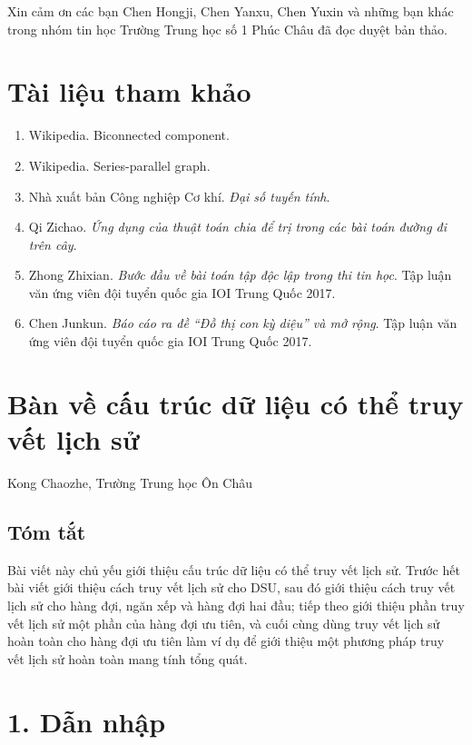 \documentclass[11pt]{article}
\begin{document}
Xin cảm ơn các bạn Chen Hongji, Chen Yanxu, Chen Yuxin và những bạn khác trong
nhóm tin học Trường Trung học số 1 Phúc Châu đã đọc duyệt bản thảo.

\section*{Tài liệu tham khảo}

\begin{enumerate}
  \item Wikipedia. Biconnected component.
  \item Wikipedia. Series-parallel graph.
  \item Nhà xuất bản Công nghiệp Cơ khí. \emph{Đại số tuyến tính}.
  \item Qi Zichao. \emph{Ứng dụng của thuật toán chia để trị trong các bài
        toán đường đi trên cây}.
  \item Zhong Zhixian. \emph{Bước đầu về bài toán tập độc lập trong thi tin
        học}. Tập luận văn ứng viên đội tuyển quốc gia IOI Trung Quốc 2017.
  \item Chen Junkun. \emph{Báo cáo ra đề ``Đồ thị con kỳ diệu'' và mở rộng}.
        Tập luận văn ứng viên đội tuyển quốc gia IOI Trung Quốc 2017.
\end{enumerate}

\clearpage
\section*{Bàn về cấu trúc dữ liệu có thể truy vết lịch sử}

\begin{center}
Kong Chaozhe, Trường Trung học Ôn Châu
\end{center}

\subsection*{Tóm tắt}

Bài viết này chủ yếu giới thiệu cấu trúc dữ liệu có thể truy vết lịch sử.
Trước hết bài viết giới thiệu cách truy vết lịch sử cho DSU, sau đó giới
thiệu cách truy vết lịch sử cho hàng đợi, ngăn xếp và hàng đợi hai đầu; tiếp
theo giới thiệu phần truy vết lịch sử một phần của hàng đợi ưu tiên, và cuối
cùng dùng truy vết lịch sử hoàn toàn cho hàng đợi ưu tiên làm ví dụ để giới
thiệu một phương pháp truy vết lịch sử hoàn toàn mang tính tổng quát.

\section*{1. Dẫn nhập}
\end{document}
